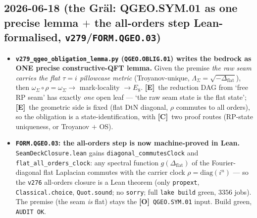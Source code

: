 \documentclass[11pt]{article}
\providecommand{\mE}{\textbf{[E]}}\providecommand{\mC}{\textbf{[C]}}
\providecommand{\mO}{\textbf{[O]}}\providecommand{\mX}{\textbf{[X]}}
\providecommand{\vref}[1]{\texttt{#1}}
\begin{document}
\subsection*{2026-06-18 (the Gr\"al: QGEO.SYM.01 as one precise lemma $+$ the all-orders step Lean-formalised, \texttt{v279}/\texttt{FORM.QGEO.03})}
\begin{itemize}
\item \textbf{\texttt{v279\_qgeo\_obligation\_lemma.py} (\texttt{QGEO.OBLIG.01}) writes the bedrock as ONE precise
  constructive-QFT lemma.} Given the premise \emph{the raw seam carries the flat $\tau{=}i$ pillowcase metric}
  (Troyanov-unique, $\Lambda_\Sigma{=}\sqrt{-\Delta_{\mathrm{flat}}}$), then $\omega_\Sigma\circ\rho=\omega_\Sigma
  \to$ mark-locality $\to E_8$. \mE\ the reduction DAG from `free RP seam' has exactly \emph{one} open leaf ---
  `the raw seam state is the flat state'; \mE\ the geometric side is fixed (flat DtN diagonal, $\rho$ commutes to
  all orders), so the obligation is a state-identification, with \mC\ two proof routes (RP-state uniqueness, or
  Troyanov $+$ OS).
\item \textbf{\texttt{FORM.QGEO.03}: the all-orders step is now machine-proved in Lean.}
  \texttt{SeamDeckClosure.lean} gains \texttt{diagonal\_commutesClock} and
  \texttt{flat\_all\_orders\_clock}: any spectral function $g(\Delta_{\mathrm{flat}})$ of the Fourier-diagonal
  flat Laplacian commutes with the carrier clock $\rho{=}\mathrm{diag}(i^n)$ --- so the \vref{v276} all-orders
  closure is a Lean theorem (only \texttt{propext}, \texttt{Classical.choice}, \texttt{Quot.sound}; no
  \texttt{sorry}; full \texttt{lake build} green, $3356$ jobs). The premise (the seam \emph{is} flat) stays the
  \mO\ \texttt{QGEO.SYM.01} input. Build green, \texttt{AUDIT OK}.
\end{itemize}
\end{document}
